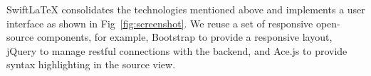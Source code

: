 \documentclass[sigconf]{acmart}
\begin{document}

SwiftLaTeX consolidates the technologies mentioned above and implements a user interface as shown in Fig~\ref{fig:screenshot}.
We reuse a set of responsive open-source components, for example, Bootstrap \cite{spurlock2013bootstrap} to provide a responsive layout, jQuery \cite{bibeault2008jquery} to manage restful connections with the backend, and Ace.js \cite{acejs} to provide syntax highlighting in the source view.








\end{document}
